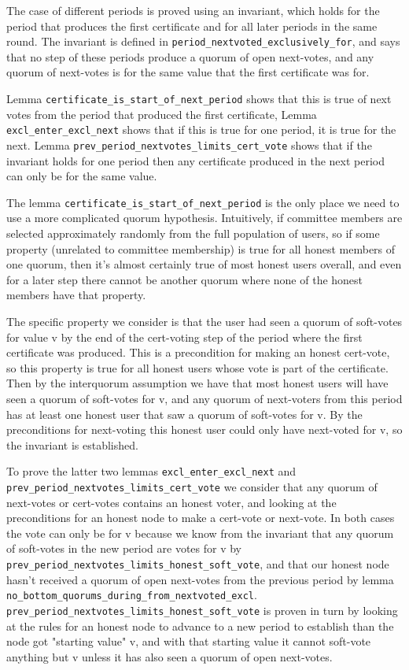 The case of different periods is proved using an invariant, which holds for the period that produces the first certificate and for all later periods in the same round. The invariant is defined in \lstinline{period_nextvoted_exclusively_for}, and says that no step of these periods produce a quorum of open next-votes, and any quorum of next-votes is for the same value that the first
certificate was for.

Lemma \lstinline{certificate_is_start_of_next_period} shows that this is true of next votes from the period that produced the first certificate,
Lemma \lstinline{excl_enter_excl_next} shows that if this is true for one period, it is true for the next.
Lemma \lstinline{prev_period_nextvotes_limits_cert_vote} shows that if the invariant holds for one period then any certificate produced in the next period can only be for the same value.

The lemma \lstinline{certificate_is_start_of_next_period} is the only place we need to use a more complicated quorum hypothesis. Intuitively, if committee members are selected approximately randomly from the full population of users, so if some property (unrelated to committee
membership) is true for all honest members of one quorum, then it's almost
certainly true of most honest users overall, and even for a later step there
cannot be another quorum where none of the honest members have that property.

The specific property we consider is that the user had seen a quorum of soft-votes
for value v by the end of the cert-voting step of the period where the first
certificate was produced.
This is a precondition for making an honest cert-vote, so this property is
true for all honest users whose vote is part of the certificate.
Then by the interquorum assumption we have that most honest users will have
seen a quorum of soft-votes for v, and any quorum of next-voters from this period
has at least one honest user that saw a quorum of soft-votes for v.
By the preconditions for next-voting this honest user could only have next-voted for v,
so the invariant is established.

To prove the latter two lemmas \lstinline{excl_enter_excl_next} and
\lstinline{prev_period_nextvotes_limits_cert_vote}
we consider that any quorum of next-votes or cert-votes contains an honest voter, and looking at the preconditions for an honest node to make a cert-vote or next-vote.
In both cases the vote can only be for v because we know from
the invariant that any quorum of soft-votes in the new period are votes for v by \lstinline{prev_period_nextvotes_limits_honest_soft_vote},
and that our honest node hasn't received a quorum of open next-votes from
the previous period by lemma
\lstinline{no_bottom_quorums_during_from_nextvoted_excl}.
\lstinline{prev_period_nextvotes_limits_honest_soft_vote} is proven in turn by
looking at the rules for an honest node to advance to a new period to establish than the node got "starting value" v, and with that starting value it cannot soft-vote anything but v unless it has also seen a quorum of open next-votes.
